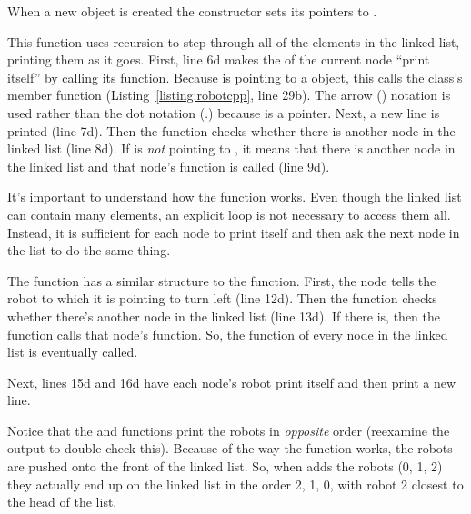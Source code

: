 
When a new  object is created the constructor sets its pointers to .


This function uses recursion to step through all of the elements in the linked list, printing them as it goes.  First, line 6d makes the  of the current node ``print itself'' by calling its  function.  Because  is pointing to a  object, this calls the  class's  member function (Listing~\ref{listing:robotcpp}, line 29b).   The arrow (\codefont{->}) notation is used rather than the dot notation (.) because  is a pointer.  Next, a new line is printed (line 7d).  Then the function checks whether there is another node in the linked list (line 8d).  If  is \emph{not} pointing to , it means that there is another node in the linked list and that node's  function is called (line 9d).  

It's important to understand how the  function works.  Even though the linked list can contain many elements, an explicit loop is not necessary to access them all.  Instead, it is sufficient for each node to print itself and then ask the next node in the list to do the same thing.


The  function has a similar structure to the  function.  First, the node tells the robot to which it is pointing to turn left (line 12d).  Then the function checks whether there's another node in the linked list (line 13d).  If there is, then the function calls that node's  function.  So, the  function of every node in the linked list is eventually called.

Next, lines 15d and 16d have each node's robot print itself and then print a new line.  

Notice that the  and  functions print the robots in \emph{opposite} order (reexamine the output to double check this).  Because of the way the  function works, the robots are pushed onto the front of the linked list.  So, when  adds the robots (0, 1, 2) they actually end up on the linked list in the order 2, 1, 0, with robot 2 closest to the head of the list.  

